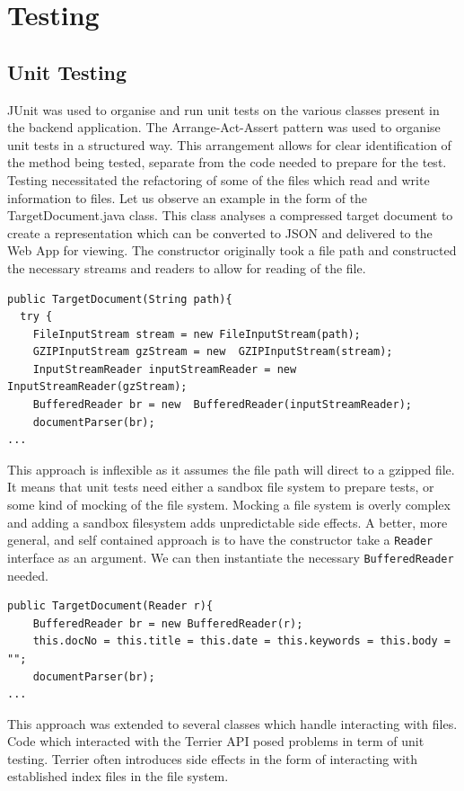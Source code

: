 \documentclass{l4proj}
\newcommand{\code}[1]{\texttt{#1}}
\begin{document}
\section{Testing} \label{testing}
\subsection{Unit Testing}
JUnit was used to organise and run unit tests on the various classes present in the backend application.
The Arrange-Act-Assert pattern was used to organise unit tests in a structured way. This arrangement allows for clear identification of the method being tested, separate from the code needed to prepare for the test.
Testing necessitated the refactoring of some of the files which read and write information to files. Let us observe an example in the form of the TargetDocument.java class. This class analyses a compressed target document to create a representation which can be converted to JSON and delivered to the Web App for viewing.
The constructor originally took a file path and constructed the necessary streams and readers to allow for reading of the file.
\begin{verbatim}
public TargetDocument(String path){
  try {
    FileInputStream stream = new FileInputStream(path);
    GZIPInputStream gzStream = new  GZIPInputStream(stream);
    InputStreamReader inputStreamReader = new  InputStreamReader(gzStream);
    BufferedReader br = new  BufferedReader(inputStreamReader);
    documentParser(br);
...
\end{verbatim}

This approach is inflexible as it assumes the file path will direct to a gzipped file. It means that unit tests need either a sandbox file system to prepare tests, or some kind of mocking of the file system. Mocking a file system is overly complex and adding a sandbox filesystem adds unpredictable side effects.
A better, more general, and self contained approach is to have the constructor take a \code{Reader} interface as an argument. We can then instantiate the necessary \code{BufferedReader} needed.

\begin{verbatim}
public TargetDocument(Reader r){
    BufferedReader br = new BufferedReader(r);
    this.docNo = this.title = this.date = this.keywords = this.body = "";
    documentParser(br);
...
\end{verbatim}

This approach was extended to several classes which handle interacting with files.
Code which interacted with the Terrier API posed problems in term of unit testing. Terrier often introduces side effects in the form of interacting with established index files in the file system.
\end{document}
